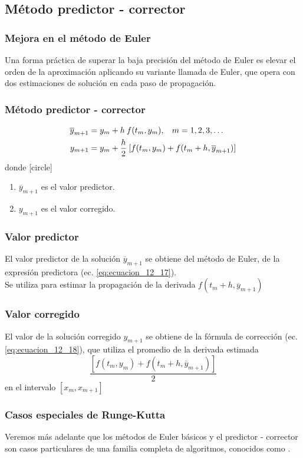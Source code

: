 \subsection{Método predictor - corrector}
\begin{frame}
\frametitle{Mejora en el método de Euler}
Una forma práctica de superar la baja precisión del método de Euler es elevar el orden de la aproximación aplicando su variante llamada   de Euler, que opera con dos estimaciones de solución en cada paso de propagación.
\end{frame}
\begin{frame}
\frametitle{Método predictor - corrector}
\begin{align}
\overline{y}_{m + 1} &= y_{m} + h \: f(t_{m}, y_{m}), \hspace{0.3cm} m = 1, 2, 3, \ldots \label{eq:ecuacion_12_17} \\
y_{m + 1} &= y_{m} + \dfrac{h}{2} \: [ f(t_{m}, y_{m}) + f(t_{m} + h, \overline{y}_{m + 1})] \label{eq:ecuacion_12_18}
\end{align}
donde
[circle]
\begin{enumerate}[<+->]
\item $ \overline{y}_{m + 1}$ es el valor predictor.
\item $y_{m + 1}$ es el valor corregido.
\end{enumerate}
\end{frame}
\begin{frame}
\frametitle{Valor predictor}
El valor predictor de la solución $ \overline{y}_{m + 1}$ se obtiene del método de Euler, de la expresión predictora (ec. \ref{eq:ecuacion_12_17}).
\\
\bigskip
Se utiliza para estimar la propagación de la derivada $f(t_{m} + h, \overline{y}_{m + 1})$
\end{frame}
\begin{frame}
\frametitle{Valor corregido}
El valor de la solución corregido $y_{m + 1}$ se obtiene de la fórmula de corrección (ec. \ref{eq:ecuacion_12_18}), que utiliza el promedio de la derivada estimada 
\[\dfrac{[ f(t_{m}, y_{m}) + f(t_{m} + h, \overline{y}_{m + 1})]}{2}
\]
en el intervalo $[x_{m}, x_{m + 1}]$
\end{frame}
\begin{frame}
\frametitle{Casos especiales de Runge-Kutta}
Veremos más adelante que los métodos de Euler básicos y el predictor - corrector son casos particulares de una familia completa de algoritmos, conocidos como .
\end{frame}
